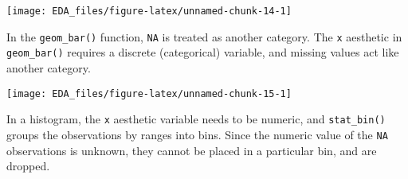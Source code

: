 \documentclass[]{book}
\newenvironment{Shaded}{\begin{snugshade}}{\end{snugshade}}
\newcommand{\CommentTok}[1]{\textcolor[rgb]{0.56,0.35,0.01}{\textit{#1}}}
\newcommand{\DataTypeTok}[1]{\textcolor[rgb]{0.13,0.29,0.53}{#1}}
\newcommand{\DecValTok}[1]{\textcolor[rgb]{0.00,0.00,0.81}{#1}}
\newcommand{\FloatTok}[1]{\textcolor[rgb]{0.00,0.00,0.81}{#1}}
\newcommand{\KeywordTok}[1]{\textcolor[rgb]{0.13,0.29,0.53}{\textbf{#1}}}
\newcommand{\NormalTok}[1]{#1}
\newcommand{\OperatorTok}[1]{\textcolor[rgb]{0.81,0.36,0.00}{\textbf{#1}}}
\newcommand{\OtherTok}[1]{\textcolor[rgb]{0.56,0.35,0.01}{#1}}
\newcommand{\StringTok}[1]{\textcolor[rgb]{0.31,0.60,0.02}{#1}}
\theoremstyle{plain}
\theoremstyle{remark}
\theoremstyle{definition}
\theoremstyle{definition}
\theoremstyle{definition}
\theoremstyle{remark}
\begin{document}
\begin{Shaded}
\end{Shaded}

\begin{center}\texttt{[image: EDA\_files/figure-latex/unnamed-chunk-14-1]} \end{center}

In the \texttt{geom\_bar()} function, \texttt{NA} is treated as another
category. The \texttt{x} aesthetic in \texttt{geom\_bar()} requires a
discrete (categorical) variable, and missing values act like another
category.

\begin{Shaded}
\end{Shaded}

\begin{center}\texttt{[image: EDA\_files/figure-latex/unnamed-chunk-15-1]} \end{center}

In a histogram, the \texttt{x} aesthetic variable needs to be numeric,
and \texttt{stat\_bin()} groups the observations by ranges into bins.
Since the numeric value of the \texttt{NA} observations is unknown, they
cannot be placed in a particular bin, and are dropped.
\end{document}
